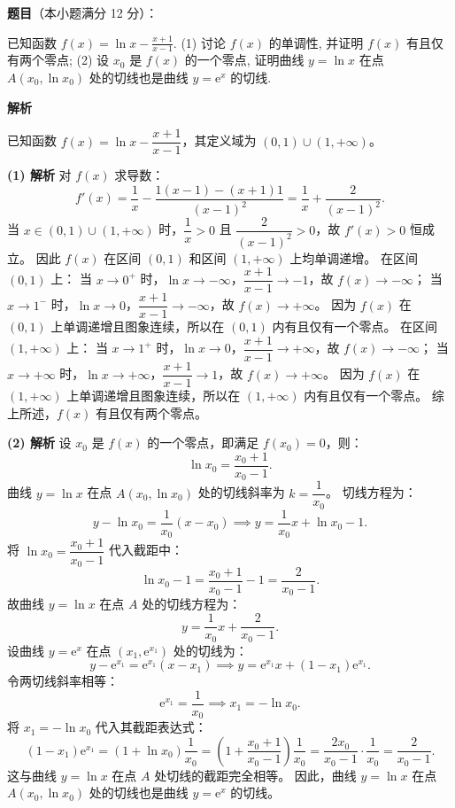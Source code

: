\begin{answer}

\textbf{题目}（本小题满分 12 分）：

已知函数 $f(x) = \ln x - \frac{x+1}{x-1}$.
(1) 讨论 $f(x)$ 的单调性, 并证明 $f(x)$ 有且仅有两个零点;
(2) 设 $x_0$ 是 $f(x)$ 的一个零点, 证明曲线 $y = \ln x$ 在点 $A(x_0, \ln x_0)$ 处的切线也是曲线 $y = \mathrm{e}^x$ 的切线.

\textbf{解析}

已知函数 $f(x) = \ln x - \dfrac{x+1}{x-1}$，其定义域为 $(0, 1) \cup (1, +\infty)$。

\textbf{(1) 解析}
对 $f(x)$ 求导数：
\nopagebreak[4]
\[f'(x) = \frac{1}{x} - \frac{1(x-1) - (x+1)1}{(x-1)^2} = \frac{1}{x} + \frac{2}{(x-1)^2}.\]
当 $x \in (0, 1) \cup (1, +\infty)$ 时，$\dfrac{1}{x} > 0$ 且 $\dfrac{2}{(x-1)^2} > 0$，故 $f'(x) > 0$ 恒成立。
因此 $f(x)$ 在区间 $(0, 1)$ 和区间 $(1, +\infty)$ 上均单调递增。
在区间 $(0, 1)$ 上：
当 $x \to 0^+$ 时，$\ln x \to -\infty$，$\dfrac{x+1}{x-1} \to -1$，故 $f(x) \to -\infty$；
当 $x \to 1^-$ 时，$\ln x \to 0$，$\dfrac{x+1}{x-1} \to -\infty$，故 $f(x) \to +\infty$。
因为 $f(x)$ 在 $(0, 1)$ 上单调递增且图象连续，所以在 $(0, 1)$ 内有且仅有一个零点。
在区间 $(1, +\infty)$ 上：
当 $x \to 1^+$ 时，$\ln x \to 0$，$\dfrac{x+1}{x-1} \to +\infty$，故 $f(x) \to -\infty$；
当 $x \to +\infty$ 时，$\ln x \to +\infty$，$\dfrac{x+1}{x-1} \to 1$，故 $f(x) \to +\infty$。
因为 $f(x)$ 在 $(1, +\infty)$ 上单调递增且图象连续，所以在 $(1, +\infty)$ 内有且仅有一个零点。
综上所述，$f(x)$ 有且仅有两个零点。

\textbf{(2) 解析}
设 $x_0$ 是 $f(x)$ 的一个零点，即满足 $f(x_0) = 0$，则：
\nopagebreak[4]
\[\ln x_0 = \frac{x_0+1}{x_0-1}.\]
曲线 $y = \ln x$ 在点 $A(x_0, \ln x_0)$ 处的切线斜率为 $k = \dfrac{1}{x_0}$。
切线方程为：
\nopagebreak[4]
\[y - \ln x_0 = \frac{1}{x_0}(x - x_0) \implies y = \frac{1}{x_0}x + \ln x_0 - 1.\]
将 $\ln x_0 = \dfrac{x_0+1}{x_0-1}$ 代入截距中：
\nopagebreak[4]
\[\ln x_0 - 1 = \frac{x_0+1}{x_0-1} - 1 = \frac{2}{x_0-1}.\]
故曲线 $y = \ln x$ 在点 $A$ 处的切线方程为：
\nopagebreak[4]
\[y = \frac{1}{x_0}x + \frac{2}{x_0-1}.\]
设曲线 $y = \mathrm{e}^x$ 在点 $(x_1, \mathrm{e}^{x_1})$ 处的切线为：
\nopagebreak[4]
\[y - \mathrm{e}^{x_1} = \mathrm{e}^{x_1}(x - x_1) \implies y = \mathrm{e}^{x_1}x + (1 - x_1)\mathrm{e}^{x_1}.\]
令两切线斜率相等：
\nopagebreak[4]
\[\mathrm{e}^{x_1} = \frac{1}{x_0} \implies x_1 = -\ln x_0.\]
将 $x_1 = -\ln x_0$ 代入其截距表达式：
\nopagebreak[4]
\[(1 - x_1)\mathrm{e}^{x_1} = (1 + \ln x_0)\frac{1}{x_0} = \left(1 + \frac{x_0+1}{x_0-1}\right)\frac{1}{x_0} = \frac{2x_0}{x_0-1} \cdot \frac{1}{x_0} = \frac{2}{x_0-1}.\]
这与曲线 $y = \ln x$ 在点 $A$ 处切线的截距完全相等。
因此，曲线 $y = \ln x$ 在点 $A(x_0, \ln x_0)$ 处的切线也是曲线 $y = \mathrm{e}^x$ 的切线。



\end{answer}

